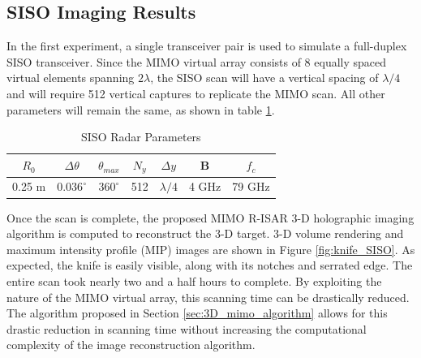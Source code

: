 \documentclass[conference]{IEEEtran}
\begin{document}
		\subsection{SISO Imaging Results}
		
		In the first experiment, a single transceiver pair is used to simulate a full-duplex SISO transceiver. Since the MIMO virtual array consists of 8 equally spaced virtual elements spanning $2\lambda$, the SISO scan will have a vertical spacing of $\lambda/4$ and will require 512 vertical captures to replicate the MIMO scan. All other parameters will remain the same, as shown in table \ref{table_SISO_radar_parameters}.
		
		\begin{table} [h]
			\caption{SISO Radar Parameters}
			\centering
			\begin{tabular}{c c c c c c c}
				\hline
				$R_0$ & $\Delta \theta$ & $\theta_{max}$ & $N_y$ & $\Delta y$ & B & $f_c$  \\ [0.5ex] 
				\hline\hline
				0.25 m & $0.036^{\circ}$ & $360^{\circ}$ & 512 & $\lambda/4$ & 4 GHz & 79 GHz \\ 
				\hline
			\end{tabular}
			\label{table_SISO_radar_parameters}
		\end{table}
	
		Once the scan is complete, the proposed MIMO R-ISAR 3-D holographic imaging algorithm is computed to reconstruct the 3-D target. 3-D volume rendering and maximum intensity profile (MIP) images are shown in Figure \ref{fig:knife_SISO}. As expected, the knife is easily visible, along with its notches and serrated edge. The entire scan took nearly two and a half hours to complete. By exploiting the nature of the MIMO virtual array, this scanning time can be drastically reduced. The algorithm proposed in Section \ref{sec:3D_mimo_algorithm} allows for this drastic reduction in scanning time without increasing the computational complexity of the image reconstruction algorithm. 
		
\end{document}
